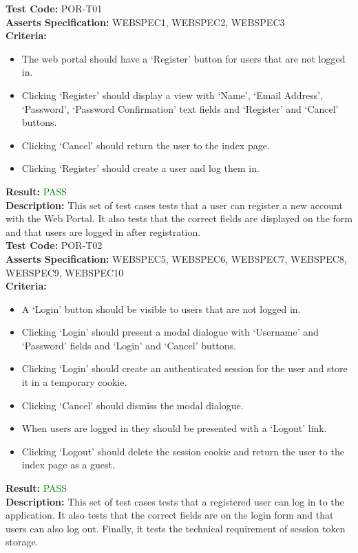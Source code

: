 \documentclass[11pt,a4paper]{report}
\begin{document}
\label{test:POR-T01}
\noindent\textbf{Test Code:} POR-T01\\
\textbf{Asserts Specification:} WEBSPEC1, WEBSPEC2, WEBSPEC3 \\ 
\textbf{Criteria:} \begin{itemize}
                     \item The web portal should have a `Register' button for users that are not logged in.
                     \item Clicking `Register' should display a view with `Name', `Email Address', `Password', `Password Confirmation' text fields and `Register' and `Cancel' buttons.
                     \item Clicking `Cancel' should return the user to the index page.
                     \item Clicking `Register' should create a user and log them in.
                   \end{itemize}  
\textbf{Result:} \textcolor{green}{PASS}\\ 
\textbf{Description:} This set of test cases tests that a user can register a new account with the Web Portal. It also tests that the correct fields are displayed on the form and that users are logged in after registration.\\

\label{test:POR-T02}
\noindent\textbf{Test Code:} POR-T02\\
\textbf{Asserts Specification:} WEBSPEC5, WEBSPEC6, WEBSPEC7, WEBSPEC8, WEBSPEC9, WEBSPEC10 \\ 
\textbf{Criteria:} \begin{itemize}
                     \item A `Login' button should be visible to users that are not logged in.
                     \item Clicking `Login' should present a modal dialogue with `Username' and `Password' fields and `Login' and `Cancel' buttons.
                     \item Clicking `Login' should create an authenticated session for the user and store it in a temporary cookie.
                     \item Clicking `Cancel' should dismiss the modal dialogue.
                     \item When users are logged in they should be presented with a `Logout' link.
                     \item Clicking `Logout' should delete the session cookie and return the user to the index page as a guest.
                   \end{itemize}  
\textbf{Result:} \textcolor{green}{PASS}\\ 
\textbf{Description:} This set of test cases tests that a registered user can log in to the application. It also tests that the correct fields are on the login form and that users can also log out. Finally, it tests the technical requirement of session token storage. \\
\end{document}

